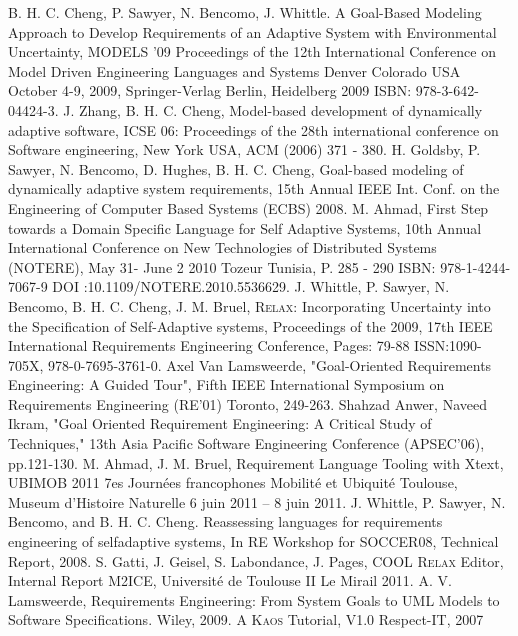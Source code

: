 \documentclass[10pt, conference, compsocconf]{IEEEtran}
\def\myrelax{\textsc{Relax}}                  %
\def\kaos{\textsc{Kaos}}
\begin{document}
\begin{thebibliography}{1}
B. H. C. Cheng, P. Sawyer, N. Bencomo, J. Whittle. A Goal-Based Modeling Approach to Develop Requirements of an Adaptive System with Environmental Uncertainty, MODELS '09 Proceedings of the 12th International Conference on Model Driven Engineering Languages and Systems Denver Colorado USA October 4-9, 2009, Springer-Verlag Berlin, Heidelberg 2009 ISBN: 978-3-642-04424-3.
J. Zhang, B. H. C. Cheng, Model-based development of dynamically adaptive software, ICSE 06: Proceedings of the 28th international conference on Software engineering, New York USA, ACM (2006) 371 - 380.
H. Goldsby, P.  Sawyer, N. Bencomo, D. Hughes, B. H. C. Cheng, Goal-based modeling of dynamically adaptive system requirements, 15th Annual IEEE Int. Conf. on the Engineering of Computer Based Systems (ECBS) 2008.
M. Ahmad, First Step towards a Domain Specific Language for Self Adaptive Systems, 10th Annual International Conference on New Technologies of Distributed Systems (NOTERE), May 31- June 2 2010 Tozeur Tunisia, P. 285 - 290 ISBN: 978-1-4244-7067-9 DOI :10.1109/NOTERE.2010.5536629.
J. Whittle, P. Sawyer, N. Bencomo, B. H. C. Cheng, J. M. Bruel, \myrelax{}: Incorporating Uncertainty into the Specification of Self-Adaptive systems, Proceedings of the 2009, 17th IEEE International Requirements Engineering Conference, Pages: 79-88 ISSN:1090-705X, 978-0-7695-3761-0.
Axel Van Lamsweerde, "Goal-Oriented Requirements Engineering: A Guided Tour", Fifth IEEE International Symposium on Requirements Engineering (RE'01) Toronto, 249-263.
Shahzad Anwer, Naveed Ikram, "Goal Oriented Requirement Engineering: A Critical Study of Techniques," 13th Asia Pacific Software Engineering Conference (APSEC'06), pp.121-130.
M. Ahmad, J. M. Bruel, Requirement Language Tooling with Xtext, UBIMOB 2011 7es Journ\'ees francophones Mobilit\'e et Ubiquit\'e Toulouse, Museum d'Histoire Naturelle 6 juin 2011 -- 8 juin 2011.
J. Whittle, P. Sawyer, N. Bencomo, and B. H. C. Cheng. Reassessing languages for requirements engineering of selfadaptive systems, In RE Workshop for SOCCER08, Technical Report, 2008.
S. Gatti, J. Geisel, S. Labondance, J. Pages, COOL \myrelax{} Editor, Internal Report M2ICE, Universit\'e de Toulouse II Le Mirail 2011.
A. V. Lamsweerde, Requirements Engineering: From System Goals to UML Models to Software Specifications. Wiley, 2009.
A \kaos{} Tutorial, V1.0  Respect-IT, 2007

\end{thebibliography}
\end{document}
